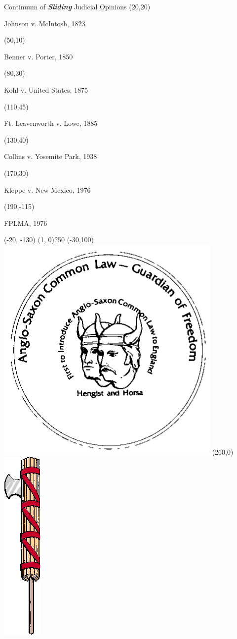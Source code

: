 \begin{frame}{Continuum of \textbf{\emph{Sliding}} Judicial Opinions}
    \Put(20,20){\Large \begin{turn}{50} Johnson v. McIntosh, 1823 \end{turn}}
    \Put(50,10){\Large \begin{turn}{50} Benner v. Porter, 1850 \end{turn}}
    \Put(80,30){\Large \begin{turn}{50} Kohl v. United States, 1875 \end{turn}}
    \Put(110,45){\Large \begin{turn}{50} Ft. Leavenworth v. Lowe, 1885 \end{turn}}
    \Put(130,40){\Large \begin{turn}{50} Collins v. Yosemite Park, 1938 \end{turn}}
    \Put(170,30){\Large \begin{turn}{50} Kleppe v. New Mexico, 1976 \end{turn}}
    \Put(190,-115){\Large \begin{turn}{50} FPLMA, 1976 \end{turn}}
    {
        \color{red}
        \thicklines
        \Put(-20, -130){ \line(1, 0){250} }
    }
    \pause
    \Put(-30,100){\includegraphics[width=.3\textwidth]{img/hh-coin.png}}
    \pause
    \Put(260,0){\includegraphics[height=.4\textheight]{img/fasces.png}}

\end{frame}
